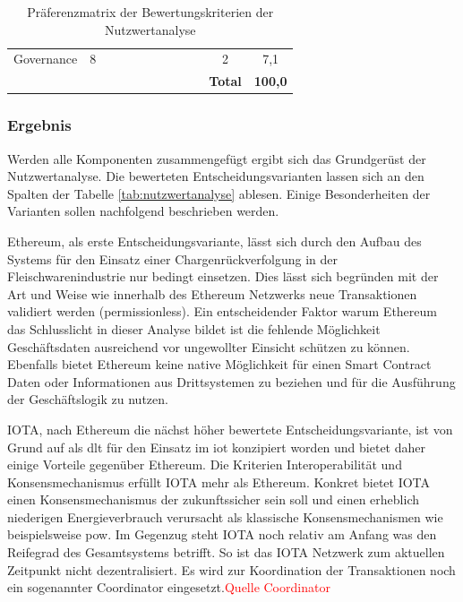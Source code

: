 \begin{table}[H]
{\begin{tabular}{@{}lccccccccccc@{}}
		Governance               & 8            & {\cellcolor{gray!25} } & {\cellcolor{gray!25} }  & {\cellcolor{gray!25} } & {\cellcolor{gray!25} } & {\cellcolor{gray!25} } & {\cellcolor{gray!25} } & {\cellcolor{gray!25} } & {\cellcolor{gray!25} } & 2               & 7,1                 \\ \addlinespace
		\midrule
		&              &                         &                          &                         &                         &                         &                         &                         &                         & \textbf{Total}  & \textbf{100,0}      \\
		\bottomrule
	\end{tabular}%
	}
	\caption{Präferenzmatrix der Bewertungskriterien der Nutzwertanalyse}
	\label{tab:preferencematrix}
\end{table}

\subsubsection{Ergebnis}
Werden alle Komponenten zusammengefügt ergibt sich das Grundgerüst der Nutzwertanalyse. Die bewerteten Entscheidungsvarianten lassen sich an den Spalten der Tabelle \ref{tab:nutzwertanalyse} ablesen. Einige Besonderheiten der Varianten sollen nachfolgend beschrieben werden.

Ethereum, als erste Entscheidungsvariante, lässt sich durch den Aufbau des Systems für den Einsatz einer Chargenrückverfolgung in der Fleischwarenindustrie nur bedingt einsetzen. Dies lässt sich begründen mit der Art und Weise wie innerhalb des Ethereum Netzwerks neue Transaktionen validiert werden (permissionless). Ein entscheidender Faktor warum Ethereum das Schlusslicht in dieser Analyse bildet ist die fehlende Möglichkeit Geschäftsdaten ausreichend vor ungewollter Einsicht schützen zu können. Ebenfalls bietet Ethereum keine native Möglichkeit für einen Smart Contract Daten oder Informationen aus Drittsystemen zu beziehen und für die Ausführung der Geschäftslogik zu nutzen.

IOTA, nach Ethereum die nächst höher bewertete Entscheidungsvariante, ist von Grund auf als \ac{dlt} für den Einsatz im \acf{iot} konzipiert worden und bietet daher einige Vorteile gegenüber Ethereum. Die Kriterien Interoperabilität und Konsensmechanismus erfüllt IOTA mehr als Ethereum. Konkret bietet IOTA einen Konsensmechanismus der zukunftssicher sein soll und einen erheblich niederigen Energieverbrauch verursacht als klassische Konsensmechanismen wie beispielsweise \ac{pow}. Im Gegenzug steht IOTA noch relativ am Anfang was den Reifegrad des Gesamtsystems betrifft. So ist das IOTA Netzwerk zum aktuellen Zeitpunkt nicht dezentralisiert. Es wird zur Koordination der Transaktionen noch ein sogenannter \glqq Coordinator\grqq{} eingesetzt.\textcolor{red}{Quelle Coordinator}

